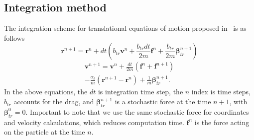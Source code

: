 \subsection{Integration method}
\label{subsec:integration_method}

The integration scheme for translational equations of motion proposed in~\cite{Taylor2013} is as follows
\begin{equation}
\label{eq:tr_coordinate_change}
	\boldsymbol{r}^{n+1} = \boldsymbol{r}^n + dt \left(
	 b_{tr} \boldsymbol{v}^n
	 + \frac{b_{tr} dt}{2m}\boldsymbol{f}^n
	 + \frac{b_{tr}}{2m}\boldsymbol{\beta}_{tr}^{n+1}
	\right)
\end{equation}
\begin{multline}
\label{eq:tr_velocity_change}
	\boldsymbol{v}^{n+1} = \boldsymbol{v}^n 
	 + \frac{dt}{2m}\left(
	 	\boldsymbol{f}^n + \boldsymbol{f}^{n+1}
	 \right) \\
	 - \frac{\alpha_{t}}{m}\left(
	 	\boldsymbol{r}^{n+1} - \boldsymbol{r}^n
	 \right)
	 + \frac{1}{m}\boldsymbol{\beta}_{tr}^{n+1}
	 .
\end{multline}
In the above equations, the $dt$ is integration time step, the $n$ index is time steps, $b_{tr}$ accounts for the drag, and $\boldsymbol{\beta}_{tr}^{n+1}$ is a stochastic force at the time $n+1$, with $\boldsymbol{\beta}_{tr}^{0} = 0$. Important to note that we use the same stochastic force for coordinates and velocity calculations, which reduces computation time. $\boldsymbol{f}^n$ is the force acting on the particle at the time $n$.

